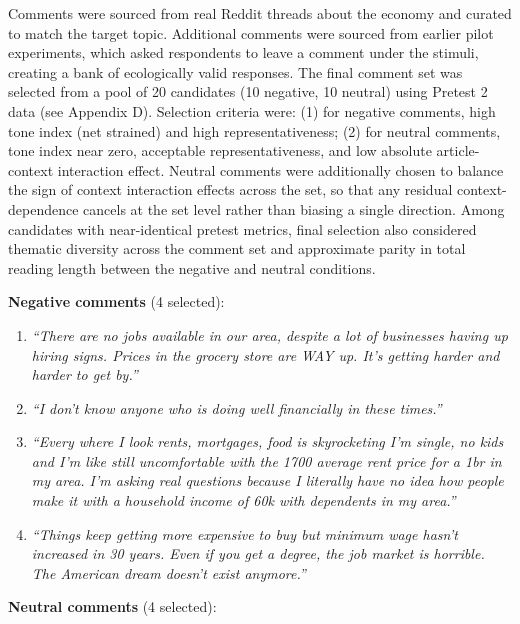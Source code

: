 \documentclass[
  12pt]{article}
\providecommand{\tightlist}{%
  \setlength{\itemsep}{0pt}\setlength{\parskip}{0pt}}
\begin{document}
Comments were sourced from real Reddit threads about the economy and
curated to match the target topic. Additional comments were sourced from
earlier pilot experiments, which asked respondents to leave a comment
under the stimuli, creating a bank of ecologically valid responses. The
final comment set was selected from a pool of 20 candidates (10
negative, 10 neutral) using Pretest 2 data (see Appendix D). Selection
criteria were: (1) for negative comments, high tone index (net strained)
and high representativeness; (2) for neutral comments, tone index near
zero, acceptable representativeness, and low absolute article-context
interaction effect. Neutral comments were additionally chosen to balance
the sign of context interaction effects across the set, so that any
residual context-dependence cancels at the set level rather than biasing
a single direction. Among candidates with near-identical pretest
metrics, final selection also considered thematic diversity across the
comment set and approximate parity in total reading length between the
negative and neutral conditions.

\textbf{Negative comments} (4 selected):

\begin{enumerate}
\def\labelenumi{\arabic{enumi}.}
\tightlist
\item
  \emph{``There are no jobs available in our area, despite a lot of
  businesses having up hiring signs. Prices in the grocery store are WAY
  up. It's getting harder and harder to get by.''}
\item
  \emph{``I don't know anyone who is doing well financially in these
  times.''}
\item
  \emph{``Every where I look rents, mortgages, food is skyrocketing I'm
  single, no kids and I'm like still uncomfortable with the 1700 average
  rent price for a 1br in my area. I'm asking real questions because I
  literally have no idea how people make it with a household income of
  60k with dependents in my area.''}
\item
  \emph{``Things keep getting more expensive to buy but minimum wage
  hasn't increased in 30 years. Even if you get a degree, the job market
  is horrible. The American dream doesn't exist anymore.''}
\end{enumerate}

\textbf{Neutral comments} (4 selected):
\end{document}
